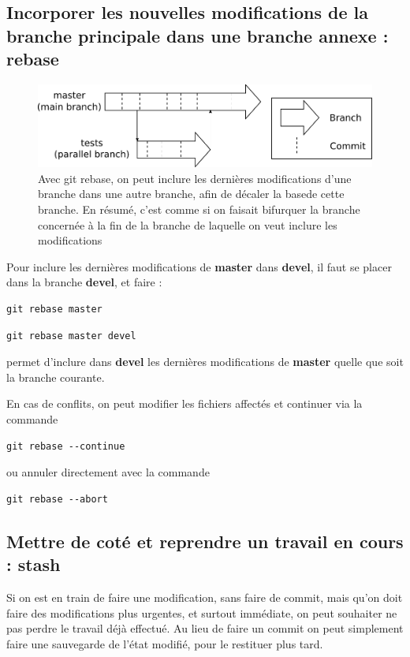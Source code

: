 \documentclass[a4paper,twoside]{article}
\begin{document}
\subsection{Incorporer les nouvelles modifications de la branche principale dans une branche annexe : rebase}
\begin{figure}[htb]
\centering
\includegraphics[width=0.75\linewidth]{figure/branchs.pdf}
\caption{Avec git rebase, on peut inclure les dernières modifications d'une branche dans une autre branche, afin de décaler la \og base\fg de cette branche. En résumé, c'est comme si on faisait bifurquer la branche concernée à la fin de la branche de laquelle on veut inclure les modifications}
\end{figure}



Pour inclure les dernières modifications de \textbf{master} dans \textbf{devel}, il faut se placer dans la branche \textbf{devel}, et faire :
\begin{verbatim}
git rebase master
\end{verbatim}


\begin{verbatim}
git rebase master devel
\end{verbatim}
permet d'inclure dans \textbf{devel} les dernières modifications de \textbf{master} quelle que soit la branche courante.
\bigskip

En cas de conflits, on peut modifier les fichiers affectés et continuer via la commande 
\begin{verbatim}
git rebase --continue
\end{verbatim}
ou annuler directement avec la commande
\begin{verbatim}
git rebase --abort
\end{verbatim}

\subsection{Mettre de coté et reprendre un travail en cours : stash}
Si on est en train de faire une modification, sans faire de commit, mais qu'on doit faire des modifications plus urgentes, et surtout immédiate, on peut souhaiter ne pas perdre le travail déjà effectué. Au lieu de faire un commit on peut simplement faire une sauvegarde de l'état modifié, pour le restituer plus tard.
\end{document}

